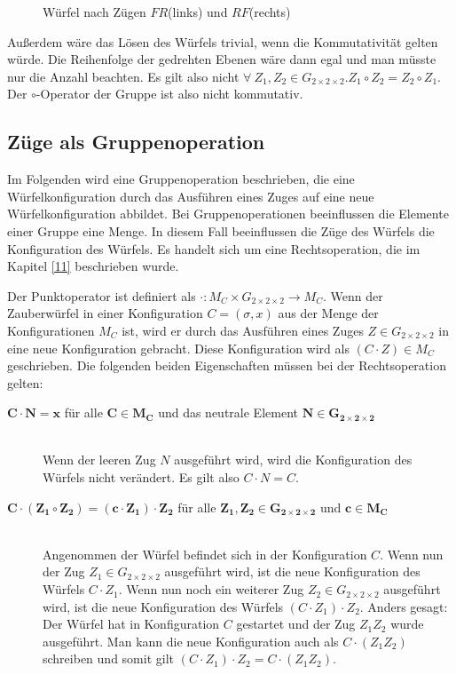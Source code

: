 \documentclass[12pt,a4paper, usenames, dvipsnames]{article}
\theoremstyle{mystyle}
\theoremstyle{definition}
\newcommand{\Gtwo}{\ensuremath{G_{2\times 2\times 2}}}
\begin{document}
\begin{figure}[h]
\caption[Würfel nach Zügen $FR$ (links) und $RF$ (rechts)]{Würfel nach Zügen $FR$(links) und $RF$(rechts)}
\label{12}
\end{figure}
Außerdem wäre das Lösen des Würfels trivial, wenn die Kommutativität gelten würde.\cite{TD} Die Reihenfolge der gedrehten Ebenen wäre dann egal und man müsste nur die Anzahl beachten. 
Es gilt also nicht $\forall \  Z_1, Z_2 \in \Gtwo. Z_1 \circ Z_2 = Z_2 \circ Z_1$. Der $\circ$-Operator der Gruppe ist also nicht kommutativ. 

%
%
%
%
%
%
%
%
%
%
%
%
%
%
%
%
%
%
%
%
\subsection*{Züge als Gruppenoperation}

Im Folgenden wird eine Gruppenoperation beschrieben, die eine Würfelkonfiguration durch das Ausführen eines Zuges auf eine neue Würfelkonfiguration abbildet. Bei Gruppenoperationen beeinflussen die Elemente einer Gruppe eine Menge. In diesem Fall beeinflussen die Züge des Würfels die Konfiguration des Würfels. Es handelt sich um eine Rechtsoperation, die im Kapitel \ref{11} beschrieben wurde.

Der Punktoperator ist definiert als $\cdot: M_C \times \Gtwo \rightarrow M_C$. Wenn der Zauberwürfel in einer Konfiguration $C=(\sigma, x)$ aus der Menge der Konfigurationen $M_C$ ist, wird er durch das Ausführen eines Zuges $Z \in \Gtwo$ in eine neue Konfiguration gebracht. Diese Konfiguration wird als $(C \cdot Z) \in M_C$ geschrieben.
Die folgenden beiden Eigenschaften müssen bei der Rechtsoperation gelten:

\begin{description}
\item [$\boldsymbol{C \cdot N = x}$ für alle $\boldsymbol{C \in M_C}$ und das neutrale Element $\boldsymbol{N \in \Gtwo}$] 
\ \\
Wenn der leeren Zug $N$ ausgeführt wird, wird die Konfiguration des Würfels nicht verändert. Es gilt also $C \cdot N = C$. 

\item [$\boldsymbol{C \cdot (Z_1 \circ Z_2) = (c \cdot Z_1) \cdot Z_2}$ für alle $\boldsymbol{Z_1, Z_2 \in \Gtwo}$ und $\boldsymbol{c \in M_C}$]
\ \\
Angenommen der Würfel befindet sich in der Konfiguration $C$. Wenn nun der Zug $Z_1 \in \Gtwo$ ausgeführt wird, ist die neue Konfiguration des Würfels $C \cdot Z_1$. Wenn nun noch ein weiterer Zug $Z_2 \in \Gtwo$ ausgeführt wird, ist die neue Konfiguration des Würfels $(C \cdot Z_1) \cdot Z_2$. 
Anders gesagt: Der Würfel hat in Konfiguration $C$ gestartet und der Zug $Z_1 Z_2$ wurde ausgeführt. Man kann die neue Konfiguration auch als $C \cdot (Z_1 Z_2)$ schreiben und somit gilt $(C \cdot Z_1) \cdot Z_2 = C \cdot (Z_1 Z_2)$. 
\end{description}
\end{document}
